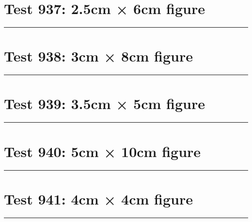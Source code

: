 \documentclass[a4paper,11pt]{article}
\begin{document}
\section*{Test 937: 2.5cm × 6cm figure}
\begin{swarmwrap}%
  \begin{minipage}[t]{2cm}
    \centering
    \rule{\linewidth}{6cm}
  \end{minipage}%
\end{swarmwrap}%
\swarmwrapnext
\lipsum[84]
\lipsum[85]
\lipsum[86]
\lipsum[87]
\lipsum[88]
\lipsum[89]
\section*{Test 938: 3cm × 8cm figure}
\begin{swarmwrap}%
  \begin{minipage}[t]{3cm}
    \centering
    \rule{\linewidth}{8cm}
  \end{minipage}%
\end{swarmwrap}%
\swarmwrapnext
\lipsum[50]
\lipsum[51]
\lipsum[52]
\section*{Test 939: 3.5cm × 5cm figure}
\begin{swarmwrap}%
  \begin{minipage}[t]{3cm}
    \centering
    \rule{\linewidth}{5cm}
  \end{minipage}%
\end{swarmwrap}%
\swarmwrapnext
\lipsum[126]
\lipsum[127]
\lipsum[128]
\lipsum[129]
\lipsum[130]
\lipsum[131]
\section*{Test 940: 5cm × 10cm figure}
\begin{swarmwrap}%
  \begin{minipage}[t]{5cm}
    \centering
    \rule{\linewidth}{10cm}
  \end{minipage}%
\end{swarmwrap}%
\swarmwrapnext
\lipsum[16]
\lipsum[17]
\lipsum[18]
\lipsum[19]
\lipsum[20]
\section*{Test 941: 4cm × 4cm figure}
\begin{swarmwrap}%
  \begin{minipage}[t]{4cm}
    \centering
    \rule{\linewidth}{4cm}
  \end{minipage}%
\end{swarmwrap}%
\swarmwrapnext
\lipsum[81]
\lipsum[82]
\lipsum[83]
\end{document}
